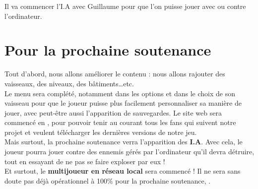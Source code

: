 \documentclass[10pt, titlepage]{report}
\begin{document}
Il va commencer l'I.A avec Guillaume pour que l'on puisse jouer avec ou contre l'ordinateur.

\chapter{Pour la prochaine soutenance}

Tout d'abord, nous allons améliorer le contenu : nous allons rajouter des vaisseaux, des niveaux, des bâtiments\dots etc.\\
Le menu sera complété, notamment dans les options et dans le choix de son vaisseau pour que le joueur puisse plus facilement personnaliser sa manière de jouer, avec peut-être aussi l'apparition de sauvegardes.
Le site web sera commencé en , pour pouvoir tenir au courant tous les fans qui suivent notre projet et veulent télécharger les dernières versions de notre jeu.\\

Mais surtout, la prochaine soutenance verra l'apparition des \textbf{I.A}. Avec cela, le joueur pourra jouer contre des ennemis gérés par l'ordinateur qu'il devra détruire, tout en essayant de ne pas se faire exploser par eux !\\

 Et surtout, le \textbf{multijoueur en réseau local} sera commencé ! Il ne sera sans doute pas déjà opérationnel à 100\% pour la prochaine soutenance, .
\end{document}
